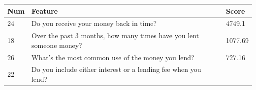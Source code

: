 \begin{longtable}[]{@{}lll@{}}
\toprule
\begin{minipage}[b]{0.05\columnwidth}\raggedright
Num\strut
\end{minipage} & \begin{minipage}[b]{0.77\columnwidth}\raggedright
Feature\strut
\end{minipage} & \begin{minipage}[b]{0.09\columnwidth}\raggedright
Score\strut
\end{minipage}\tabularnewline
\midrule
\endhead
\begin{minipage}[t]{0.05\columnwidth}\raggedright
24\strut
\end{minipage} & \begin{minipage}[t]{0.77\columnwidth}\raggedright
Do you receive your money back in time?\strut
\end{minipage} & \begin{minipage}[t]{0.09\columnwidth}\raggedright
4749.1\strut
\end{minipage}\tabularnewline
\begin{minipage}[t]{0.05\columnwidth}\raggedright
18\strut
\end{minipage} & \begin{minipage}[t]{0.77\columnwidth}\raggedright
Over the past 3 months, how many times have you lent someone
money?\strut
\end{minipage} & \begin{minipage}[t]{0.09\columnwidth}\raggedright
1077.69\strut
\end{minipage}\tabularnewline
\begin{minipage}[t]{0.05\columnwidth}\raggedright
26\strut
\end{minipage} & \begin{minipage}[t]{0.77\columnwidth}\raggedright
What's the most common use of the money you lend?\strut
\end{minipage} & \begin{minipage}[t]{0.09\columnwidth}\raggedright
727.16\strut
\end{minipage}\tabularnewline
\begin{minipage}[t]{0.05\columnwidth}\raggedright
22\strut
\end{minipage} & \begin{minipage}[t]{0.77\columnwidth}\raggedright
Do you include either interest or a lending fee when you lend?\strut
\end{minipage} & \begin{minipage}[t]{0.09\columnwidth}\raggedright

\end{minipage}
\end{longtable}
